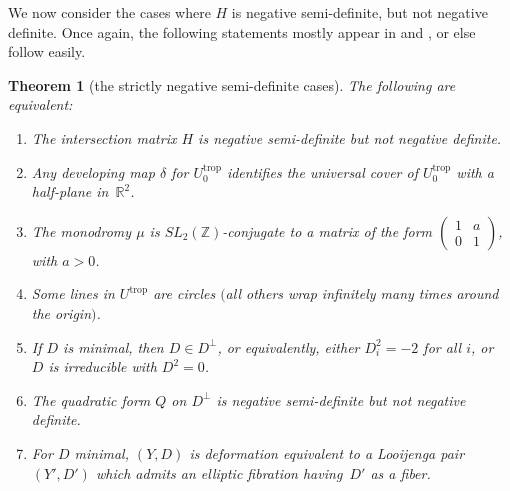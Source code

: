 \documentclass[10pt,a4paper]{amsart}
\numberwithin{equation}{section}
\numberwithin{figure}{section}
\numberwithin{table}{section}
\DeclareMathOperator{\trop}{trop}
\let\bb=\mathbb
\newtheorem{thm}{Theorem}[section]
\theoremstyle{definition}
\begin{document}
We now consider the cases where $H$ is negative semi-definite, but not negative definite. Once again, the following statements mostly appear in \cite{GHK1} and \cite{GHK2}, or else follow easily.
\begin{thm}[the strictly negative semi-definite cases]\label{The strictly negative semi-definite case}\label{NegSD}
The following are equivalent:
\begin{enumerate}\itemsep=0pt
\item[$1.$] The {intersection matrix} $H$ is negative semi-definite but not negative definite.
\item[$2.$] Any {developing map} $\delta$ for $U^{\trop}_0$ identifies the universal cover of $U^{\trop}_0$ with a half-plane in~$\bb{R}^2$.
\item[$3.$] The monodromy $\mu$ is $SL_2(\bb{Z})$-conjugate to a matrix of the form
	$\left(\begin{smallmatrix}
		1 &a \\
		0 &1
		\end{smallmatrix}\right)$,
		 with $a > 0$.
\item[$4.$] Some {lines} in $U^{\trop}$ are circles $($all others wrap infinitely many times around the origin$)$.
\item[$5.$] If $D$ is minimal, then $D \in D^{\perp}$, or equivalently, either $D_i^2 = -2$ for all $i$, or~$D$ is irreducible with $D^2=0$.
\item[$6.$] The {quadratic form} $Q$ on $D^{\perp}$ is negative semi-definite but not negative definite.
\item[$7.$] For $D$ minimal, $(Y,D)$ is deformation equivalent to a Looijenga pair $(Y',D')$ which admits an elliptic fibration having~$D'$ as a fiber.
\end{enumerate}
\end{thm}
\end{document}
